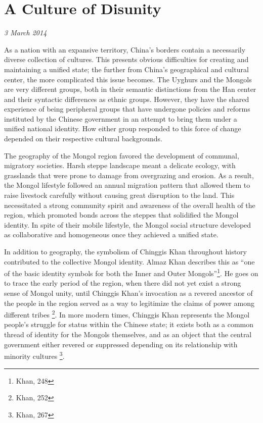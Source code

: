 \section{A Culture of Disunity}
\textit{3 March 2014}

As a nation with an expansive territory, China's borders contain a necessarily
diverse collection of cultures. This presents obvious difficulties for
creating and maintaining a unified state; the further from China's
geographical and cultural center, the more complicated this issue becomes. The
Uyghurs and the Mongols are very different groups, both in their semantic
distinctions from the Han center and their syntactic differences as ethnic
groups.  However, they have the shared experience of being peripheral groups
that have undergone policies and reforms instituted by the Chinese government
in an attempt to bring them under a unified national identity. How either group
responded to this force of change depended on their respective cultural
backgrounds.

The geography of the Mongol region favored the development of communal,
migratory societies. Harsh steppe landscape meant a delicate ecology,
with grasslands that were prone to damage from overgrazing and erosion. As a
result, the Mongol lifestyle followed an annual migration pattern that allowed
them to raise livestock carefully without causing great disruption to the
land. This necessitated a strong community spirit and awareness of the
overall health of the region, which promoted bonds across the steppes that solidified the Mongol
identity. In spite of their mobile lifestyle, the Mongol social structure
developed as collaborative and homogeneous once they achieved a unified state.

In addition to geography, the symbolism of
Chinggis Khan throughout history contributed to the collective Mongol identity.
Almaz Khan describes this as ``one of the basic identity symbols for both the
Inner and Outer Mongols''\footnote{Khan,
248}. He goes on to trace the early period of the region, when there did
not yet exist a strong sense of Mongol unity, until Chinggis Khan's invocation as a
revered ancestor of the people in the region served as a way to legitimize the
claims of power among different tribes \footnote{Khan, 252}. In more modern
times, Chinggis Khan represents the Mongol people's struggle for status within
the Chinese state; it exists both as a common thread of identity for the
Mongols themselves, and as an object that the central government either revered
or suppressed depending on its relationship with minority cultures
\footnote{Khan, 267}.

